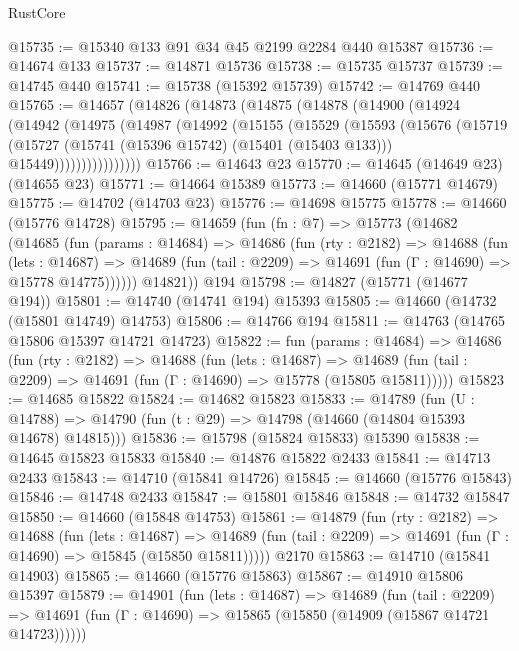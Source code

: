 \begin{lexlean}{RustCore}
\begin{coremodule}
@15735 := @15340 @133 @91 @34 @45 @2199 @2284 @440 @15387
@15736 := @14674 @133
@15737 := @14871 @15736
@15738 := @15735 @15737
@15739 := @14745 @440
@15741 := @15738 (@15392 @15739)
@15742 := @14769 @440
@15765 := @14657
    (@14826
      (@14873
        (@14875
          (@14878
            (@14900
              (@14924
                (@14942
                  (@14975
                    (@14987
                      (@14992
                        (@15155
                          (@15529
                            (@15593
                              (@15676
                                (@15719
                                  (@15727
                                    (@15741 (@15396 @15742) (@15401 (@15403 @133)))
                                    @15449))))))))))))))))
@15766 := @14643 @23
@15770 := @14645 (@14649 @23) (@14655 @23)
@15771 := @14664 @15389
@15773 := @14660 (@15771 @14679)
@15775 := @14702 (@14703 @23)
@15776 := @14698 @15775
@15778 := @14660 (@15776 @14728)
@15795 := @14659
    (fun (fn : @7) =>
    @15773
      (@14682
        (@14685
          (fun (params : @14684) =>
          @14686
            (fun (rty : @2182) =>
            @14688
              (fun (lets : @14687) =>
              @14689 (fun (tail : @2209) => @14691 (fun (Γ : @14690) => @15778 @14775))))))
        @14821))
    @194
@15798 := @14827 (@15771 (@14677 @194))
@15801 := @14740 (@14741 @194) @15393
@15805 := @14660 (@14732 (@15801 @14749) @14753)
@15806 := @14766 @194
@15811 := @14763 (@14765 @15806 @15397 @14721 @14723)
@15822 := fun (params : @14684) =>
  @14686
    (fun (rty : @2182) =>
    @14688
      (fun (lets : @14687) =>
      @14689 (fun (tail : @2209) => @14691 (fun (Γ : @14690) => @15778 (@15805 @15811)))))
@15823 := @14685 @15822
@15824 := @14682 @15823
@15833 := @14789
    (fun (U : @14788) => @14790 (fun (t : @29) => @14798 (@14660 (@14804 @15393 @14678) @14815)))
@15836 := @15798 (@15824 @15833) @15390
@15838 := @14645 @15823 @15833
@15840 := @14876 @15822 @2433
@15841 := @14713 @2433
@15843 := @14710 (@15841 @14726)
@15845 := @14660 (@15776 @15843)
@15846 := @14748 @2433
@15847 := @15801 @15846
@15848 := @14732 @15847
@15850 := @14660 (@15848 @14753)
@15861 := @14879
    (fun (rty : @2182) =>
    @14688
      (fun (lets : @14687) =>
      @14689 (fun (tail : @2209) => @14691 (fun (Γ : @14690) => @15845 (@15850 @15811)))))
    @2170
@15863 := @14710 (@15841 @14903)
@15865 := @14660 (@15776 @15863)
@15867 := @14910 @15806 @15397
@15879 := @14901
    (fun (lets : @14687) =>
    @14689
      (fun (tail : @2209) =>
      @14691 (fun (Γ : @14690) => @15865 (@15850 (@14909 (@15867 @14721 @14723))))))

\end{coremodule}
\end{lexlean}
